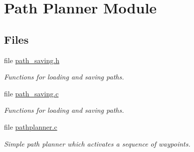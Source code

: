 \hypertarget{group___path_planner_module}{\section{\-Path \-Planner \-Module}
\label{group___path_planner_module}
}
\subsection*{\-Files}
\begin{DoxyCompactItemize}
\item 
file \hyperlink{path__saving_8h}{path\-\_\-saving.\-h}
\begin{DoxyCompactList}\small\item\em \-Functions for loading and saving paths. \end{DoxyCompactList}\item 
file \hyperlink{path__saving_8c}{path\-\_\-saving.\-c}
\begin{DoxyCompactList}\small\item\em \-Functions for loading and saving paths. \end{DoxyCompactList}\item 
file \hyperlink{pathplanner_8c}{pathplanner.\-c}
\begin{DoxyCompactList}\small\item\em \-Simple path planner which activates a sequence of waypoints. \end{DoxyCompactList}\end{DoxyCompactItemize}

